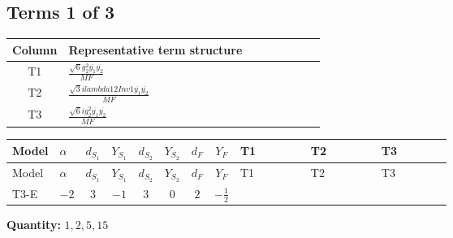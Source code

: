 \documentclass[8pt]{article}
\begin{document}
\begin{landscape}
\subsection*{Terms 1 of 3}
\begin{center}
\begin{tabular}{@{}c >{\raggedright\arraybackslash}p{0.82\linewidth}@{}}
\toprule
Column & Representative term structure \\
\midrule
T1 & \(\displaystyle \frac{\sqrt{6} g_{2}^{2} \overline{y_{1}} \overline{y_{2}}}{MF}\) \\
\midrule
T2 & \(\displaystyle \frac{\sqrt{3} i lambda12Inv1 \overline{y_{1}} \overline{y_{2}}}{MF}\) \\
\midrule
T3 & \(\displaystyle \frac{\sqrt{6} i g_{2}^{2} \overline{y_{1}} \overline{y_{2}}}{MF}\) \\
\midrule
\bottomrule
\end{tabular}
\end{center}
\smallskip
\tiny
\begin{longtable}{@{}llcccccc >{\raggedright\arraybackslash}p{0.21\linewidth} >{\raggedright\arraybackslash}p{0.21\linewidth} >{\raggedright\arraybackslash}p{0.21\linewidth}@{}}
\toprule
Model & $\alpha$ & $d_{S_1}$ & $Y_{S_1}$ & $d_{S_2}$ & $Y_{S_2}$ & $d_F$ & $Y_F$ & T1 & T2 & T3 \\
\midrule
\endfirsthead
\toprule
Model & $\alpha$ & $d_{S_1}$ & $Y_{S_1}$ & $d_{S_2}$ & $Y_{S_2}$ & $d_F$ & $Y_F$ & T1 & T2 & T3 \\
\midrule
\endhead
T3-E & $-2$ & $3$ & $-1$ & $3$ & $0$ & $2$ & $-\frac{1}{2}$ & \scriptsize\adjustbox{max width=\linewidth}{$\begin{gathered} - \frac{\sqrt{6} g_{2}^{2} \overline{y_{1}} \overline{y_{2}}}{6 MF}\end{gathered}$} & \scriptsize\adjustbox{max width=\linewidth}{$\begin{gathered} - \frac{\sqrt{3} i lambda12Inv1 \overline{y_{1}} \overline{y_{2}}}{6 MF}\end{gathered}$} & \scriptsize\adjustbox{max width=\linewidth}{$\begin{gathered} \frac{\sqrt{6} i g_{2}^{2} \overline{y_{1}} \overline{y_{2}}}{6 MF}\end{gathered}$} \\
\midrule
\bottomrule
\end{longtable}
\clearpage
\noindent\textbf{Quantity: }$\mathrm{1,2,5,15}$\par\smallskip

\end{landscape}
\end{document}
